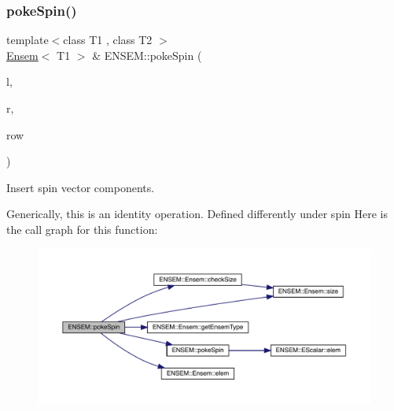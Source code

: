 \subsubsection{\texorpdfstring{pokeSpin()}{pokeSpin()}\hspace{0.1cm}{\footnotesize\ttfamily [1/2]}}
{\footnotesize\ttfamily template$<$class T1 , class T2 $>$ \\
\mbox{\hyperlink{classENSEM_1_1Ensem}{Ensem}}$<$ T1 $>$ \& E\+N\+S\+E\+M\+::poke\+Spin (\begin{DoxyParamCaption}\item[{\mbox{\hyperlink{classENSEM_1_1Ensem}{Ensem}}$<$ T1 $>$ \&}]{l,  }\item[{const \mbox{\hyperlink{classENSEM_1_1Ensem}{Ensem}}$<$ T2 $>$ \&}]{r,  }\item[{int}]{row }\end{DoxyParamCaption})\hspace{0.3cm}{\ttfamily [inline]}}



Insert spin vector components. 

Generically, this is an identity operation. Defined differently under spin Here is the call graph for this function\+:\nopagebreak
\begin{figure}[H]
\begin{center}
\leavevmode
\includegraphics[width=350pt]{d1/d9e/group__eensem_ga20ff818f34faa2f1d5067da3ff139ba9_cgraph}
\end{center}
\end{figure}
\mbox{\label{group__eensem_ga21cbf6a127bd98e6cf1909afe3050089}} 

